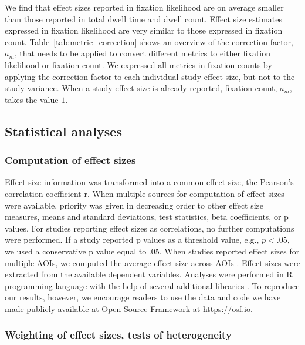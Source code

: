 We find that effect sizes reported in fixation likelihood are on average smaller than those reported in total dwell time and dwell count. Effect size estimates expressed in fixation likelihood are very similar to those expressed in fixation count. Table~\ref{tab:metric_correction} shows an overview of the correction factor, $a_m$, that needs to be applied to convert different metrics to either fixation likelihood or fixation count. We expressed all metrics in fixation counts by applying the correction factor to each individual study effect size, but not to the study variance. When a study effect size is already reported, fixation count, $a_m$, takes the value $1$.  

\subsection{Statistical analyses}
\subsubsection{Computation of effect sizes}

Effect size information was transformed into a common effect size, the Pearson’s correlation coefficient r. When multiple sources for computation of effect sizes were available, priority was given in decreasing order to other effect size measures, means and standard deviations, test statistics, beta coefficients, or p values. For studies reporting effect sizes as correlations, no further computations were performed. If a study reported p values as a threshold value, e.g., $p < .05$, we used a conservative p value equal to .05. When studies reported effect sizes for multiple AOIs, we computed the average effect size across AOIs \citep[for a similar approach, see][]{chita2016attention}. Effect sizes were extracted from the available dependent variables. Analyses were performed in R programming language with the help of several additional libraries \citep{R2020,datatable,tidyverse,metafor,irr,lme4,lmerTest,xtable,extrafont}. To reproduce our results, however, we encourage readers to use the data and code we have made publicly available at Open Source Framework at \href{https://osf.io/buk7p/?view_only=73d36c26dd794f9689c954b13c63c474}{https://osf.io}. %


\subsubsection{Weighting of effect sizes, tests of heterogeneity}

